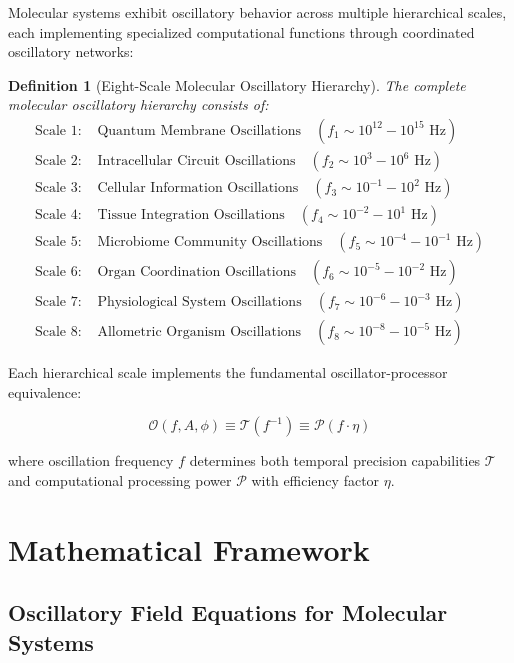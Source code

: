 \documentclass[12pt,a4paper]{article}
\newtheorem{definition}[theorem]{Definition}
\begin{document}
Molecular systems exhibit oscillatory behavior across multiple hierarchical scales, each implementing specialized computational functions through coordinated oscillatory networks:

\begin{definition}[Eight-Scale Molecular Oscillatory Hierarchy]
The complete molecular oscillatory hierarchy consists of:
\begin{align}
\text{Scale 1: } &\text{Quantum Membrane Oscillations} \quad (f_1 \sim 10^{12}-10^{15} \text{ Hz}) \\
\text{Scale 2: } &\text{Intracellular Circuit Oscillations} \quad (f_2 \sim 10^3-10^6 \text{ Hz}) \\
\text{Scale 3: } &\text{Cellular Information Oscillations} \quad (f_3 \sim 10^{-1}-10^2 \text{ Hz}) \\
\text{Scale 4: } &\text{Tissue Integration Oscillations} \quad (f_4 \sim 10^{-2}-10^1 \text{ Hz}) \\
\text{Scale 5: } &\text{Microbiome Community Oscillations} \quad (f_5 \sim 10^{-4}-10^{-1} \text{ Hz}) \\
\text{Scale 6: } &\text{Organ Coordination Oscillations} \quad (f_6 \sim 10^{-5}-10^{-2} \text{ Hz}) \\
\text{Scale 7: } &\text{Physiological System Oscillations} \quad (f_7 \sim 10^{-6}-10^{-3} \text{ Hz}) \\
\text{Scale 8: } &\text{Allometric Organism Oscillations} \quad (f_8 \sim 10^{-8}-10^{-5} \text{ Hz})
\end{align}
\end{definition}

Each hierarchical scale implements the fundamental oscillator-processor equivalence:

\begin{equation}
\mathcal{O}(f, A, \phi) \equiv \mathcal{T}(f^{-1}) \equiv \mathcal{P}(f \cdot \eta)
\end{equation}

where oscillation frequency $f$ determines both temporal precision capabilities $\mathcal{T}$ and computational processing power $\mathcal{P}$ with efficiency factor $\eta$.

\section{Mathematical Framework}

\subsection{Oscillatory Field Equations for Molecular Systems}
\end{document}
